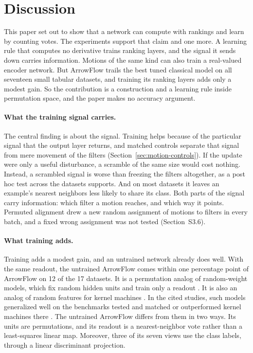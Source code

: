 \section{Discussion}\label{sec:discussion}

This paper set out to show that a network can compute with rankings and learn by counting votes. The experiments support that claim and one more. A learning rule that computes no derivative trains ranking layers, and the signal it sends down carries information. Motions of the same kind can also train a real-valued encoder network. But ArrowFlow trails the best tuned classical model on all seventeen small tabular datasets, and training its ranking layers adds only a modest gain. So the contribution is a construction and a learning rule inside permutation space, and the paper makes no accuracy argument.

\paragraph{What the training signal carries.}
The central finding is about the signal. Training helps because of the particular signal that the output layer returns, and matched controls separate that signal from mere movement of the filters (Section~\ref{sec:motion-controls}). If the update were only a useful disturbance, a scramble of the same size would cost nothing. Instead, a scrambled signal is worse than freezing the filters altogether, as a post hoc test across the datasets supports. And on most datasets it leaves an example's nearest neighbors less likely to share its class. Both parts of the signal carry information: which filter a motion reaches, and which way it points. Permuted alignment drew a new random assignment of motions to filters in every batch, and a fixed wrong assignment was not tested (Section~S3.6).

\paragraph{What training adds.}
Training adds a modest gain, and an untrained network already does well. With the same readout, the untrained ArrowFlow comes within one percentage point of ArrowFlow on 12 of the 17 datasets. It is a permutation analog of random-weight models, which fix random hidden units and train only a readout \citep{pao1994learning,huang2006extreme}. It is also an analog of random features for kernel machines \citep{rahimi2007random}. In the cited studies, such models generalized well on the benchmarks tested \citep{huang2006extreme} and matched or outperformed kernel machines there \citep{huang2012extreme,rahimi2007random}. The untrained ArrowFlow differs from them in two ways. Its units are permutations, and its readout is a nearest-neighbor vote rather than a least-squares linear map. Moreover, three of its seven views use the class labels, through a linear discriminant projection.

